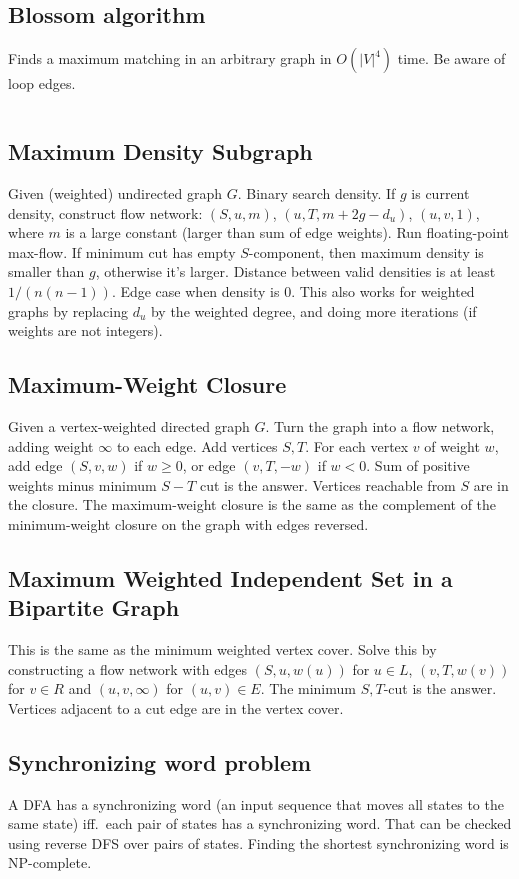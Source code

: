 \documentclass[8pt,a4paper,landscape,oneside]{amsart}
\newcommand{\mintedstyle}[2]{\inputminted[fontsize=\normalsize,baselinestretch=.9,breaklines,tabsize=2]{#1}{code/#2}}
\newcommand{\code}[1]{\mintedstyle{cpp}{#1}}
\begin{document}
\begin{multicols*}{3}
\subsection{Blossom algorithm}
Finds a maximum matching in an arbitrary graph in $O(|V|^4)$ time.
Be aware of loop edges.
\code{graphs/blossom.cpp}

\subsection{Maximum Density Subgraph}
Given (weighted) undirected graph $G$. Binary search density. If $g$ is
current density, construct flow network: $(S, u, m)$, $(u, T,
m+2g-d_u)$, $(u,v,1)$, where $m$ is a large constant (larger than sum
of edge weights). Run floating-point max-flow. If minimum cut has empty
$S$-component, then maximum density is smaller than $g$, otherwise it's
larger. Distance between valid densities is at least $1/(n(n-1))$. Edge
case when density is $0$. This also works for weighted graphs by
replacing $d_u$ by the weighted degree, and doing more iterations (if
weights are not integers).

\subsection{Maximum-Weight Closure}
Given a vertex-weighted directed graph $G$. Turn the graph into a flow
network, adding weight $\infty$ to each edge. Add vertices $S,T$. For
each vertex $v$ of weight $w$, add edge $(S,v,w)$ if $w\geq 0$, or edge
$(v,T,-w)$ if $w<0$. Sum of positive weights minus minimum $S-T$ cut is
the answer. Vertices reachable from $S$ are in the closure. The
maximum-weight closure is the same as the complement of the
minimum-weight closure on the graph with edges reversed.

\subsection{Maximum Weighted Independent Set in a Bipartite Graph}
This is the same as the minimum weighted vertex cover. Solve this by
constructing a flow network with edges $(S,u,w(u))$ for $u\in L$,
$(v,T,w(v))$ for $v\in R$ and $(u,v,\infty)$ for $(u,v)\in E$. The
minimum $S,T$-cut is the answer. Vertices adjacent to a cut edge are
in the vertex cover.

\subsection{Synchronizing word problem}
A DFA has a synchronizing word (an input sequence that moves all states
to the same state) iff.\ each pair of states has a synchronizing word.
That can be checked using reverse DFS over pairs of states. Finding the
shortest synchronizing word is NP-complete.


\end{multicols*}
\end{document}
